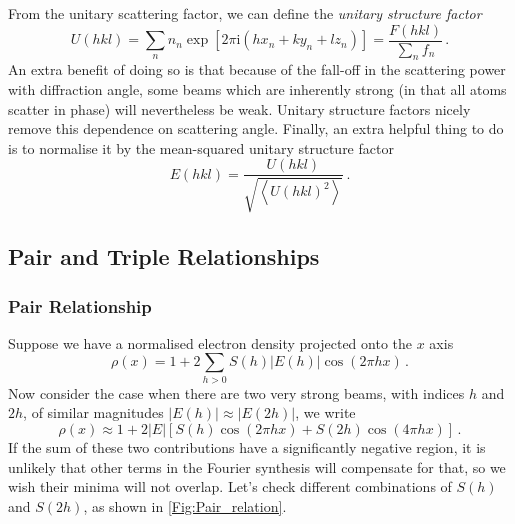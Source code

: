 \documentclass{article}
\theoremstyle{plain}\theoremheaderfont{\normalfont\itshape}\theorembodyfont{\rmfamily}\theoremseparator{.}\newtheorem*{rem}{Remark}\newtheorem*{ex}{Example}\newtheorem*{proof}{Proof}\newtheorem*{altp}{Alternative proof}
\theoremstyle{plain}\theoremheaderfont{\normalfont\bfseries}\theorembodyfont{\rmfamily}\theoremseparator{.}\newtheorem{thm}{Theorem}[section]\newtheorem{lem}[thm]{Lemma}\newtheorem{prop}[thm]{Proposition}\newtheorem*{cor}{Corollary}\newtheorem{defn}[thm]{Definition}\newtheorem{clm}[thm]{Claim}\newtheorem{clminproof}{Claim}\newtheorem*{law}{Law}\newtheorem{pos}[thm]{Postulate}
\theoremstyle{break}\theoremheaderfont{\normalfont\itshape}\theorembodyfont{\rmfamily}\theoremseparator{.\medskip}\newtheorem*{proofskip}{Proof}\newtheorem*{exs}{Examples}\newtheorem*{rems}{Remarks}
\theoremstyle{break}\theoremheaderfont{\normalfont\bfseries}\theorembodyfont{\rmfamily}\theoremseparator{.\medskip}\newtheorem{lemskip}[thm]{Lemma}\newtheorem{defnskip}[thm]{Definition}\newtheorem{propskip}[thm]{Proposition}\newtheorem{thmskip}[thm]{Theorem}
\numberwithin{equation}{section}
\newcommand{\ii}{\mathrm{i}}
\newcommand{\abs}[1]{\left| #1 \right|}
\newcommand{\eval}[1]{\left\langle #1 \right\rangle}
\begin{document}
    From the unitary scattering factor, we can define the \textit{unitary structure factor}
    \begin{equation}
        U(hkl)=\sum_n n_n\exp[2\pi \ii(hx_n+ky_n+lz_n)]=\frac{F(hkl)}{\sum_n f_n}\,.
    \end{equation}
    An extra benefit of doing so is that because of the fall-off in the scattering power with diffraction angle, some beams which are inherently strong (in that all atoms scatter in phase) will nevertheless be weak. Unitary structure factors nicely remove this dependence on scattering angle. Finally, an extra helpful thing to do is to normalise it by the mean-squared unitary structure factor
    \begin{equation}
        E(hkl)=\frac{U(hkl)}{\sqrt{\eval{U(hkl)^2}}}\,.
    \end{equation}

    \subsection{Pair and Triple Relationships}
    \subsubsection{Pair Relationship}
    Suppose we have a normalised electron density projected onto the \(x\) axis
    \begin{equation}
        \rho(x)=1+2\sum_{h>0}S(h)\abs{E(h)}\cos(2\pi hx)\,.
    \end{equation}
    Now consider the case when there are two very strong beams, with indices \(h\) and \(2h\), of similar magnitudes \(\abs{E(h)}\approx\abs{E(2h)}\), we write
    \begin{equation}
        \rho(x)\approx 1+2\abs{E}[S(h)\cos(2\pi hx)+S(2h)\cos(4\pi hx)]\,.
    \end{equation}
    If the sum of these two contributions have a significantly negative region, it is unlikely that other terms in the Fourier synthesis will compensate for that, so we wish their minima will not overlap. Let's check different combinations of \(S(h)\) and \(S(2h)\), as shown in \cref{Fig:Pair_relation}.
\end{document}
